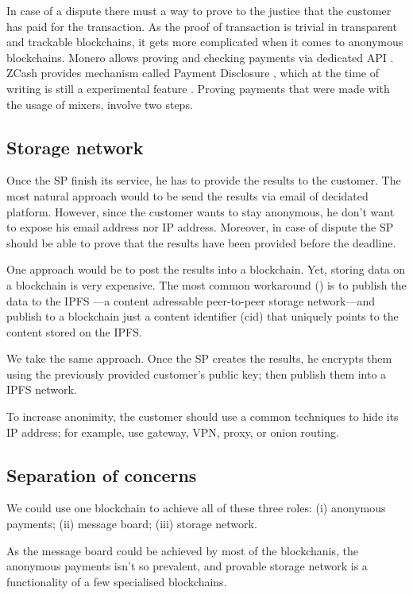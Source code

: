 \documentclass{ieeeaccess}
\begin{document}
In case of a dispute there must a way to prove to the justice that the
customer has paid for the transaction. As the proof of transaction is
trivial in transparent and trackable blockchains, it gets more
complicated when it comes to anonymous blockchains. Monero allows
proving and checking payments via dedicated API \cite{Howtopro46}.
ZCash provides mechanism called Payment Disclosure \cite{AnIntrod25},
which at the time of writing is still a experimental feature
\cite{paymentd11}. Proving payments that were made with the usage of
mixers, involve two steps.

\subsection{Storage network}\label{storage-network}
Once the SP finish its service, he has to provide the results to the
customer. The most natural approach would to be send the results via
email of decidated platform. However, since the customer wants to stay
anonymous, he don't want to expose his email address nor IP address.
Moreover, in case of dispute the SP should be able to prove that the
results have been provided before the deadline.

One approach would be to post the results into a blockchain. Yet,
storing data on a blockchain is very expensive. The most common
workaround
(\cite{shahid2020blockchain, wang2019auditable, chen2017improved, Usageide95})
is to publish the data to the IPFS \cite{benet2014ipfs}—a content
adressable peer-to-peer storage network—and publish to a blockchain
just a content identifier (cid) that uniquely points to the content
stored on the IPFS.

We take the same approach. Once the SP creates the results, he encrypts
them using the previously provided customer's public key; then publish
them into a IPFS network.

To increase anonimity, the customer should use a common techniques to
hide its IP address; for example, use gateway, VPN, proxy, or onion
routing.

\subsection{Separation of concerns}
We could use one blockchain to achieve all of these three roles: (i)
anonymous payments; (ii) message board; (iii) storage network.

As the message board could be achieved by most of the blockchanis, the
anonymous payments isn't so prevalent, and provable storage network is a
functionality of a few specialised blockchains.
\end{document}
